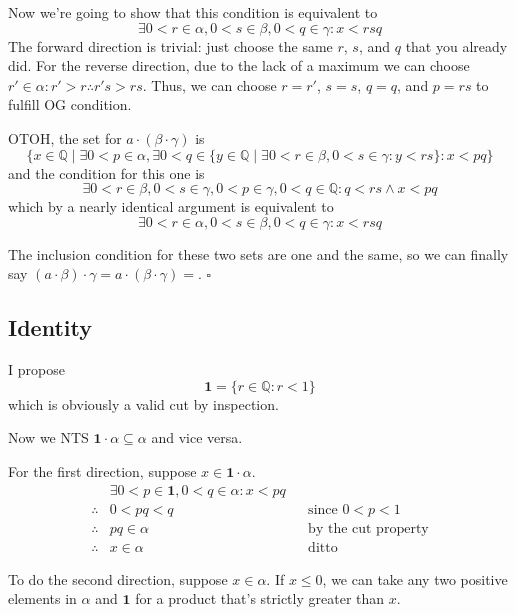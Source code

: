 \documentclass[12pt]{article}
\newcommand{\Q}{\mathbb{Q}}
\begin{document}
Now we're going to show that this condition is equivalent to
\[\exists 0 < r \in \alpha, 0 < s \in \beta, 0 < q \in \gamma: x < rsq\]
The forward direction is trivial: just choose the same $r$, $s$, and $q$ that you already did.
For the reverse direction, due to the lack of a maximum we can choose $r' \in \alpha: r' > r \therefore r's > rs$.
Thus, we can choose $r=r'$, $s=s$, $q=q$, and $p=rs$ to fulfill OG condition.

OTOH, the set for $a \cdot (\beta \cdot \gamma)$ is
\[\{x \in \Q \mid \exists 0 < p \in \alpha, \exists 0 < q \in \{y \in \Q \mid \exists 0 < r \in \beta, 0 < s \in \gamma: y < rs\}: x < pq\}\]
and the condition for this one is
\[\exists 0 < r \in \beta, 0 < s \in \gamma, 0 < p \in \gamma, 0 < q \in \Q: q < rs \land x < pq\]
which by a nearly identical argument is equivalent to
\[\exists 0 < r \in \alpha, 0 < s \in \beta, 0 < q \in \gamma: x < rsq\]

The inclusion condition for these two sets are one and the same,
so we can finally say $(a \cdot \beta) \cdot \gamma = a \cdot (\beta \cdot \gamma)=$.
$\square$

\pagebreak

\subsection{Identity}

I propose
\[\mathbf{1}=\{r \in \Q: r < 1\}\]
which is obviously a valid cut by inspection.

Now we NTS $\mathbf{1} \cdot \alpha \subseteq \alpha$ and vice versa.

For the first direction, suppose $x \in \mathbf{1} \cdot \alpha$.
\begin{align*}
               & \exists 0<p \in \mathbf{1}, 0<q \in \alpha: x < pq                                 \\
  \therefore{} & 0<pq<q                                             &  & \text{since } 0 < p < 1    \\
  \therefore{} & pq \in \alpha                                      &  & \text{by the cut property} \\
  \therefore{} & x \in \alpha                                       &  & \text{ditto}
\end{align*}

To do the second direction, suppose $x \in \alpha$.
If $x \le 0$, we can take any two positive elements in $\alpha$ and $\mathbf{1}$
for a product that's strictly greater than $x$.
\end{document}
